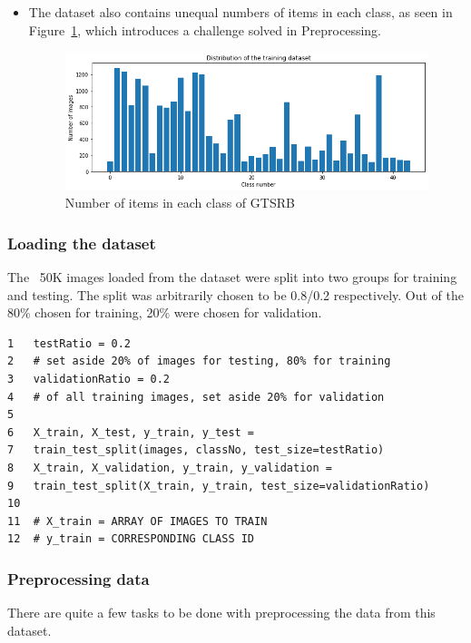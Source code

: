 \documentclass[12pt, landscape]{article}
\begin{document}
\begin{multicols}{3}
\begin{itemize}
    \item The dataset also contains unequal numbers of items in each class, as
    seen in Figure~\ref{fig:dataset1balance}, which introduces a challenge solved in
    Preprocessing.
    \begin{figure}[H]
        \centerline{\includegraphics[scale = 0.5]{download.png}}
        \caption{Number of items in each class of GTSRB}
        \label{fig:dataset1balance}
    \end{figure}

  \end{itemize}

\subsubsection{Loading the dataset}
The ~50K images loaded from the dataset were split into two groups for training
and testing. The split was arbitrarily chosen to be 0.8/0.2 respectively. Out of
the 80\% chosen for training, 20\% were chosen for validation.

\color{red}
\begin{Verbatim}[fontsize=\small]
1   testRatio = 0.2 
2   # set aside 20% of images for testing, 80% for training
3   validationRatio = 0.2 
4   # of all training images, set aside 20% for validation
5
6   X_train, X_test, y_train, y_test = 
7   train_test_split(images, classNo, test_size=testRatio)
8   X_train, X_validation, y_train, y_validation = 
9   train_test_split(X_train, y_train, test_size=validationRatio)
10 
11  # X_train = ARRAY OF IMAGES TO TRAIN
12  # y_train = CORRESPONDING CLASS ID
\end{Verbatim}
\color{black}

\subsubsection{Preprocessing data}
There are quite a few tasks to be done with preprocessing the data from this
dataset. 


\end{multicols}
\end{document}
